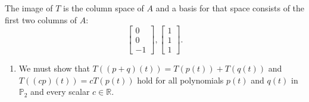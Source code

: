 \documentclass[12pt,letterpaper]{article}
\begin{document}
\begin{enumerate}
\begin{enumerate}
The image of $T$ is the column space of $A$ and a basis for that space
consists of the first two columns of $A$:
$$\begin{bmatrix}0\\0\\-1\end{bmatrix}, \begin{bmatrix}1\\1\\1\end{bmatrix}.$$
\end{enumerate}

\Answer
\begin{enumerate}
\item We must show that $T((p+q)(t)) = T(p(t)) + T(q(t))$ and $T((cp)(t)) =
cT(p(t))$ hold for all polynomials $p(t)$ and $q(t)$ in $\mathbb{P}_2$
and every scalar $c \in \mathbb{R}$.


\end{enumerate}
\end{enumerate}
\end{document}

